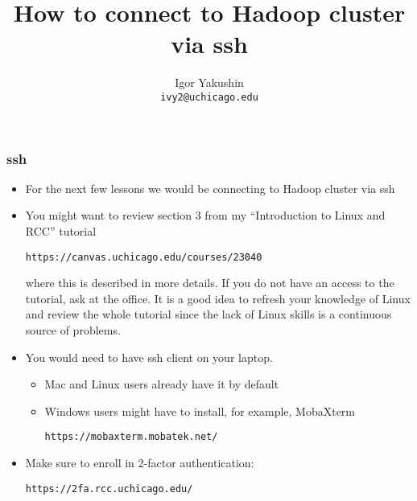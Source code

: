 \documentclass{beamer}
\title{\huge{How to connect to Hadoop cluster via ssh}}
\author{Igor Yakushin \\ \texttt{ivy2@uchicago.edu}}
\date{}
\begin{document}



\begin{frame}
  \titlepage
\end{frame}


\begin{frame}[fragile]
  \frametitle{ssh}
  \begin{itemize}
  \item For the next few lessons we would be connecting to Hadoop cluster via {\color{mycolorcli} ssh}
  \item You might want to review section 3 from my ``Introduction to Linux and RCC'' tutorial
    {\color{mycolorcli}
\begin{verbatim}
https://canvas.uchicago.edu/courses/23040
\end{verbatim}
    }
    where this is described in more details.
    If you do not have an access to the tutorial, ask at the office. It is a good idea to refresh your knowledge of Linux and review the whole tutorial since the lack of Linux skills is a continuous source of problems.
  \item You would need to have ssh client on your laptop.
    \begin{itemize}
    \item Mac and Linux users already have it by default
    \item Windows users might have to install, for example, MobaXterm
    {\color{mycolorcli}
\begin{verbatim}
https://mobaxterm.mobatek.net/
\end{verbatim}
    }
    \end{itemize}
    
  \item Make sure to enroll in 2-factor authentication:
    {\color{mycolorcli}
\begin{verbatim}
https://2fa.rcc.uchicago.edu/
\end{verbatim}
    }
  \end{itemize}
\end{frame}
\end{document}
